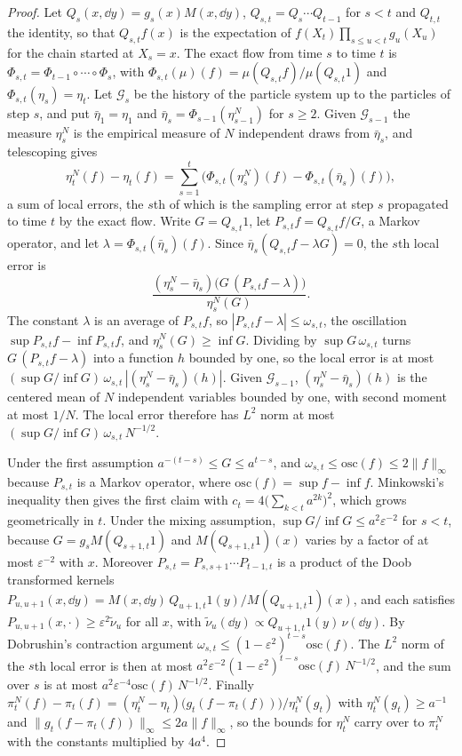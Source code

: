 \begin{proof}
Let $Q_s(x,\dd y) = g_s(x)M(x,\dd y)$, $Q_{s,t} = Q_s\cdots Q_{t-1}$ for $s<t$ and $Q_{t,t}$ the identity, so that $Q_{s,t}f(x)$ is the expectation of $f(X_t)\prod_{s\leq u<t}g_u(X_u)$ for the chain started at $X_s = x$. The exact flow from time $s$ to time $t$ is $\Phi_{s,t} = \Phi_{t-1}\circ\cdots\circ\Phi_s$, with $\Phi_{s,t}(\mu)(f) = \mu(Q_{s,t}f)/\mu(Q_{s,t}1)$ and $\Phi_{s,t}(\eta_s) = \eta_t$. Let $\mathcal{G}_s$ be the history of the particle system up to the particles of step $s$, and put $\bar\eta_1 = \eta_1$ and $\bar\eta_s = \Phi_{s-1}(\eta^N_{s-1})$ for $s\geq2$. Given $\mathcal{G}_{s-1}$ the measure $\eta^N_s$ is the empirical measure of $N$ independent draws from $\bar\eta_s$, and telescoping gives
\[
\eta^N_t(f)-\eta_t(f) = \sum_{s=1}^t\Big(\Phi_{s,t}(\eta^N_s)(f)-\Phi_{s,t}(\bar\eta_s)(f)\Big),
\]
a sum of local errors, the $s$th of which is the sampling error at step $s$ propagated to time $t$ by the exact flow. Write $G = Q_{s,t}1$, let $P_{s,t}f = Q_{s,t}f/G$, a Markov operator, and let $\lambda = \Phi_{s,t}(\bar\eta_s)(f)$. Since $\bar\eta_s(Q_{s,t}f-\lambda G) = 0$, the $s$th local error is
\[
\frac{(\eta^N_s-\bar\eta_s)\big(G\,(P_{s,t}f-\lambda)\big)}{\eta^N_s(G)}.
\]
The constant $\lambda$ is an average of $P_{s,t}f$, so $|P_{s,t}f-\lambda|\leq\omega_{s,t}$, the oscillation $\sup P_{s,t}f-\inf P_{s,t}f$, and $\eta^N_s(G)\geq\inf G$. Dividing by $\sup G\,\omega_{s,t}$ turns $G\,(P_{s,t}f-\lambda)$ into a function $h$ bounded by one, so the local error is at most $(\sup G/\inf G)\,\omega_{s,t}\,|(\eta^N_s-\bar\eta_s)(h)|$. Given $\mathcal{G}_{s-1}$, $(\eta^N_s-\bar\eta_s)(h)$ is the centered mean of $N$ independent variables bounded by one, with second moment at most $1/N$. The local error therefore has $L^2$ norm at most $(\sup G/\inf G)\,\omega_{s,t}\,N^{-1/2}$.

Under the first assumption $a^{-(t-s)}\leq G\leq a^{t-s}$, and $\omega_{s,t}\leq\mathrm{osc}(f)\leq2\|f\|_\infty$ because $P_{s,t}$ is a Markov operator, where $\mathrm{osc}(f) = \sup f-\inf f$. Minkowski's inequality then gives the first claim with $c_t = 4\big(\sum_{k<t}a^{2k}\big)^2$, which grows geometrically in $t$. Under the mixing assumption, $\sup G/\inf G\leq a^2\varepsilon^{-2}$ for $s<t$, because $G = g_sM(Q_{s+1,t}1)$ and $M(Q_{s+1,t}1)(x)$ varies by a factor of at most $\varepsilon^{-2}$ with $x$. Moreover $P_{s,t} = P_{s,s+1}\cdots P_{t-1,t}$ is a product of the Doob transformed kernels $P_{u,u+1}(x,\dd y) = M(x,\dd y)\,Q_{u+1,t}1(y)/M(Q_{u+1,t}1)(x)$, and each satisfies $P_{u,u+1}(x,\cdot)\geq\varepsilon^2\tilde\nu_u$ for all $x$, with $\tilde\nu_u(\dd y)\propto Q_{u+1,t}1(y)\,\nu(\dd y)$. By Dobrushin's contraction argument $\omega_{s,t}\leq(1-\varepsilon^2)^{t-s}\mathrm{osc}(f)$. The $L^2$ norm of the $s$th local error is then at most $a^2\varepsilon^{-2}(1-\varepsilon^2)^{t-s}\mathrm{osc}(f)\,N^{-1/2}$, and the sum over $s$ is at most $a^2\varepsilon^{-4}\mathrm{osc}(f)\,N^{-1/2}$. Finally $\pi^N_t(f)-\pi_t(f) = (\eta^N_t-\eta_t)\big(g_t(f-\pi_t(f))\big)/\eta^N_t(g_t)$ with $\eta^N_t(g_t)\geq a^{-1}$ and $\|g_t(f-\pi_t(f))\|_\infty\leq2a\|f\|_\infty$, so the bounds for $\eta^N_t$ carry over to $\pi^N_t$ with the constants multiplied by $4a^4$.
\end{proof}

